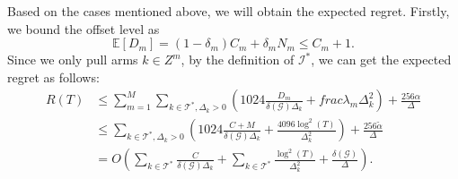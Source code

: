 Based on the cases mentioned above, we will obtain the expected regret. Firstly, we bound the offset level as
\[\mathbb{E}[D_m] = (1-\delta_m)C_m + \delta_m N_m \leq C_m + 1.\]
Since we only pull arms $k \in Z^m$, by the definition of $\mathcal{I}^*$, we can get the expected regret as follows:
\begin{equation*}
    \begin{split}
        R(T) &\leq \sum_{m=1}^M\sum_{k \in \mathcal{T}^*,\Delta_k > 0}\left(1024\frac{D_m}{\delta(\mathcal{G})\Delta_k} + frac{\lambda_m}{\Delta_k^2}\right) + \frac{256\alpha}{\Delta} \\
        &\leq \sum_{k \in \mathcal{T}^*,\Delta_k > 0}\left(1024\frac{C + M}{\delta(\mathcal{G})\Delta_k} + \frac{4096\log^2(T)}{\Delta_k^2}\right) + \frac{256\widetilde{\alpha}}{\Delta} \\
        &= O\left(\sum_{k \in \mathcal{T}^*}\frac{C}{\delta(\mathcal{G})\Delta_k} + \sum_{k \in \mathcal{T}^*}\frac{\log^2(T)}{\Delta_{k}^2} + \frac{\delta(\mathcal{G})}{\Delta}\right).
    \end{split}
\end{equation*}